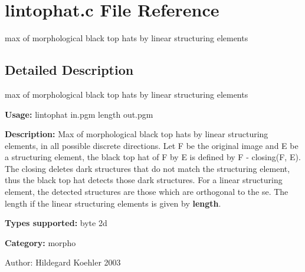\section{lintophat.c File Reference}
\label{lintophat_8c}
max of morphological black top hats by linear structuring elements  




\label{_details}
\subsection{Detailed Description}
max of morphological black top hats by linear structuring elements 

{\bf Usage:} lintophat in.pgm length out.pgm

{\bf Description:} Max of morphological black top hats by linear structuring elements, in all possible discrete directions. Let F be the original image and E be a structuring element, the black top hat of F by E is defined by F - closing(F, E). The closing deletes dark structures that do not match the structuring element, thus the black top hat detects those dark structures. For a linear structuring element, the detected structures are those which are orthogonal to the se. The length if the linear structuring elements is given by {\bf length}.

{\bf Types supported:} byte 2d

{\bf Category:} morpho

\begin{Desc}
\item[Author:]Hildegard Koehler 2003 \end{Desc}

